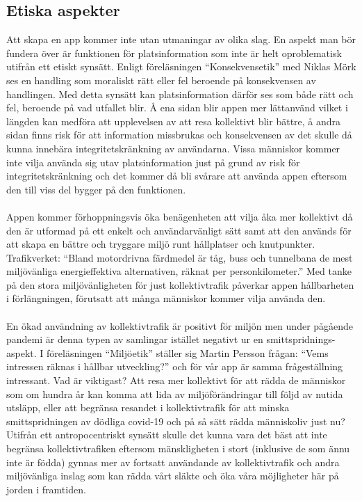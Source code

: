 \documentclass{article}
\begin{document}
\subsection*{Etiska aspekter}

Att skapa en app kommer inte utan utmaningar av olika slag. En aspekt man bör fundera över är funktionen för platsinformation som inte är helt oproblematisk utifrån ett etiskt synsätt. Enligt föreläsningen “Konsekvensetik” med Niklas Mörk ses en handling som moraliskt rätt eller fel beroende på konsekvensen av handlingen. Med detta synsätt kan platsinformation därför ses som både rätt och fel, beroende på vad utfallet blir. Å ena sidan blir appen mer lättanvänd vilket i längden kan medföra att upplevelsen av att resa kollektivt blir bättre, å andra sidan finns risk för att information missbrukas och konsekvensen av det skulle då kunna innebära integritetskränkning av användarna. Vissa människor kommer inte vilja använda sig utav platsinformation just på grund av risk för integritetskränkning och det kommer då bli svårare att använda appen eftersom den till viss del bygger på den funktionen. 
\\\\
Appen kommer förhoppningsvis öka benägenheten att vilja åka mer kollektivt då den är utformad på ett enkelt och användarvänligt sätt samt att den används för att skapa en bättre och tryggare miljö runt hållplatser och knutpunkter. Trafikverket: “Bland motordrivna färdmedel är tåg, buss och tunnelbana de mest miljövänliga energieffektiva alternativen, räknat per personkilometer.” Med tanke på den stora miljövänligheten för just kollektivtrafik påverkar appen hållbarheten i förlängningen, förutsatt att många människor kommer vilja använda den. 
\\\\
En ökad användning av kollektivtrafik är positivt för miljön men under pågående pandemi är denna typen av samlingar istället negativt ur en smittspridnings-aspekt. I föreläsningen “Miljöetik” ställer sig Martin Persson frågan: “Vems intressen räknas i hållbar utveckling?” och för vår app är samma frågeställning intressant. Vad är viktigast? Att resa mer kollektivt för att rädda de människor som om hundra år kan komma att lida av miljöförändringar till följd av nutida utsläpp, eller att begränsa resandet i kollektivtrafik för att minska smittspridningen av dödliga covid-19 och på så sätt rädda människoliv just nu? Utifrån ett antropocentriskt synsätt skulle det kunna vara det bäst att inte begränsa kollektivtrafiken eftersom mänskligheten i stort (inklusive de som ännu inte är födda) gynnas mer av fortsatt användande av kollektivtrafik och andra miljövänliga inslag som kan rädda vårt släkte och öka våra möjligheter här på jorden i framtiden. 
\end{document}

